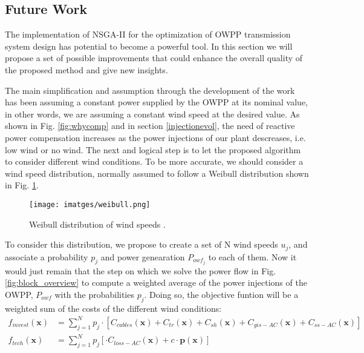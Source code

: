 \documentclass[a4paper,11pt, titlepage, twoside]{article}
\begin{document}
\subsection{Future Work}\label{futurework}

The implementation of NSGA-II for the optimization of OWPP transmission system design has potential to become a powerful tool. In this section we will propose a set of possible improvements
that could enhance the overall quality of the proposed method and give new insights.\par 

The main simplification and assumption through the development of the work has been assuming a constant power supplied by the OWPP
at its nominal value, in other words, we are assuming a constant wind speed at the desired value. As shown in Fig. \ref{fig:whycomp} and in section \ref{injectionevol}, the need of reactive power compensation increases as the power injections of our plant descreases, i.e. low wind or no wind.
The next and logical step is to let the proposed algorithm to consider different wind conditions. To be more accurate, we should consider a wind speed distribution, normally assumed to follow a Weibull distribution shown in Fig. \ref{fig:weibull}.

\begin{figure}[H]
    \centering
    \texttt{[image: imatges/weibull.png]}
    \caption{Weibull distribution of wind speeds \cite{paperbase}.}
    \label{fig:weibull}
\end{figure}

To consider this distribution, we propose to create a set of N wind speeds $u_j$,  and associate a probability $p_j$ and power genearation $P_{owf_j}$ to each of them. Now it would just remain that the step on which we solve the power flow in Fig. \ref{fig:block_overview} to compute a 
weighted average of the power injections of the OWPP, $P_{owf}$  with the probabilities $p_j$. Doing so, the objective funtion will be a weighted sum of the costs of the different wind conditions:
\begin{equation}
\begin{aligned}
        f_{invest}(\mathbf{x}) &= \sum_{j=1}^{N} p_j \cdot  \left[ C_{cables}(\mathbf{x}) + C_{tr}(\mathbf{x}) + C_{sh}(\mathbf{x}) + C_{gis-AC}(\mathbf{x}) + C_{ss-AC}(\mathbf{x}) \right] \\
        f_{tech}(\mathbf{x}) &= \sum_{j=1}^{N} p_j \left[ \cdot C_{loss-AC}(\mathbf{x}) + c \cdot \mathbf{p(x)} \right] \\       
\end{aligned}   
\end{equation}
\end{document}
